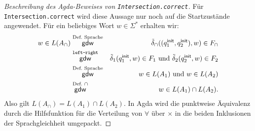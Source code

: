 \begin{proof}[Beschreibung des Agda-Beweises von \texttt{Intersection.correct}]
Für \texttt{Intersection.correct} wird diese Aussage nur noch auf die
Startzustände angewendet.
Für ein beliebiges Wort $w\in\Sigma^*$ erhalten wir:
\begin{eqnarray*}
  w\in L(A_\cap)
  &\stackrel{\text{Def.\ Sprache}}{\mathsf{gdw}}&
    \tilde{\delta}_\cap((q^\mathsf{init}_1,q^\mathsf{init}_2),w)\in F_\cap\\
  &\stackrel{\text{\texttt{left-right}}}{\mathsf{gdw}}&
    \tilde{\delta}_1(q^\mathsf{init}_1,w)\in F_1
    \text{ und }
    \tilde{\delta}_2(q^\mathsf{init}_2,w)\in F_2\\
  &\stackrel{\text{Def.\ Sprache}}{\mathsf{gdw}}&
    w\in L(A_1) \text{ und } w\in L(A_2)\\
  &\stackrel{\text{Def.\ }\cap}{\mathsf{gdw}}&
    w\in L(A_1)\cap L(A_2).
\end{eqnarray*}
Also gilt $L(A_\cap)=L(A_1)\cap L(A_2)$.
In Agda wird die punktweise Äquivalenz durch
die Hilfsfunktion für die Verteilung von $\forall$ über $\times$ in die
beiden Inklusionen der Sprachgleichheit umgepackt.
\end{proof}
